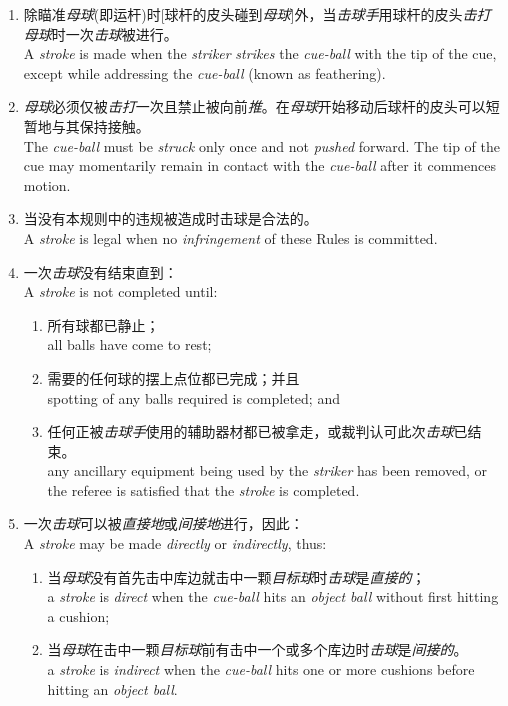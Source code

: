 \begin{enumerate}[label=(\alph*)]
    \item 除瞄准\emph{母球}(即运杆)时[球杆的皮头碰到\emph{母球}]外，当\emph{击球手}用球杆的皮头\emph{击打}\emph{母球}时一次\emph{击球}被进行。\\
    A \emph{stroke} is made when the \emph{striker} \emph{strikes} the \emph{cue-ball} with the tip of the cue, except while addressing the \emph{cue-ball} (known as feathering).
    \item \emph{母球}必须仅被\emph{击打}一次且禁止被向前\emph{推}。在\emph{母球}开始移动后球杆的皮头可以短暂地与其保持接触。\\
    The \emph{cue-ball} must be \emph{struck} only once and not \emph{pushed} forward. The tip of the cue may momentarily remain in contact with the \emph{cue-ball} after it commences motion.
    \item 当没有本规则中的违规被造成时击球是合法的。\\
    A \emph{stroke} is legal when no \emph{infringement} of these Rules is committed.
    \item 一次\emph{击球}没有结束直到：\\
    A \emph{stroke} is not completed until:
    \begin{enumerate}[label=(\roman*)]
        \item 所有球都已静止；\\
        all balls have come to rest;
        \item 需要的任何球的摆上点位都已完成；并且\\
        spotting of any balls required is completed; and
        \item 任何正被\emph{击球手}使用的辅助器材都已被拿走，或裁判认可此次\emph{击球}已结束。\\
        any ancillary equipment being used by the \emph{striker} has been removed, or the referee is satisfied that the \emph{stroke} is completed.
    \end{enumerate}
    \item 一次\emph{击球}可以被\emph{直接地}或\emph{间接地}进行，因此：\\
    A \emph{stroke} may be made \emph{directly} or \emph{indirectly}, thus:
    \begin{enumerate}[label=(\roman*)]
        \item 当\emph{母球}没有首先击中库边就击中一颗\emph{目标球}时\emph{击球}是\emph{直接的}；\\
        a \emph{stroke} is \emph{direct} when the \emph{cue-ball} hits an \emph{object ball} without first hitting a cushion;
        \item 当\emph{母球}在击中一颗\emph{目标球}前有击中一个或多个库边时\emph{击球}是\emph{间接的}。\\
        a \emph{stroke} is \emph{indirect} when the \emph{cue-ball} hits one or more cushions before hitting an \emph{object ball}.
    \end{enumerate}
\end{enumerate}

